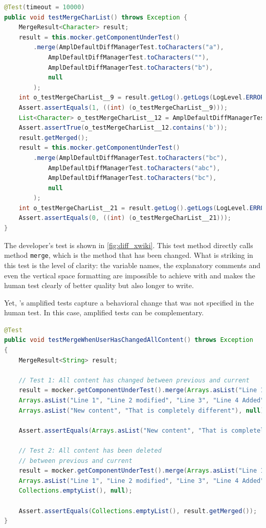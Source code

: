 \begin{lstlisting}[language=java,caption=Test generated by \DCIA that detects the behavioral change of \textsc{d3101ae} of XWiki.,label=fig:ampl_xwiki]
@Test(timeout = 10000)
public void testMergeCharList() throws Exception {
	MergeResult<Character> result;
	result = this.mocker.getComponentUnderTest()
		.merge(AmplDefaultDiffManagerTest.toCharacters("a"), 
			AmplDefaultDiffManagerTest.toCharacters(""), 
			AmplDefaultDiffManagerTest.toCharacters("b"), 
			null
		);
	int o_testMergeCharList__9 = result.getLog().getLogs(LogLevel.ERROR).size();
	Assert.assertEquals(1, ((int) (o_testMergeCharList__9)));
	List<Character> o_testMergeCharList__12 = AmplDefaultDiffManagerTest.toCharacters("b");
	Assert.assertTrue(o_testMergeCharList__12.contains('b'));
	result.getMerged();
	result = this.mocker.getComponentUnderTest()
		.merge(AmplDefaultDiffManagerTest.toCharacters("bc"), 
			AmplDefaultDiffManagerTest.toCharacters("abc"), 
			AmplDefaultDiffManagerTest.toCharacters("bc"), 
			null
		);
	int o_testMergeCharList__21 = result.getLog().getLogs(LogLevel.ERROR).size();
	Assert.assertEquals(0, ((int) (o_testMergeCharList__21)));
}
\end{lstlisting}

The developer's test is shown in \autoref{fig:diff_xwiki}.
This test method directly calls method \texttt{merge}, which is the method that has been changed. 
What is striking in this test is the level of clarity: 
the variable names, the explanatory comments and even the vertical space formatting are impossible to achieve with \DCIA and makes the human test clearly of better quality but also longer to write.

Yet, \DCIA's amplified tests capture a behavioral change that was not specified in the human test.
In this case, amplified tests can be complementary.

\begin{lstlisting}[language=java,caption=Developer test for \textsc{d3101ae} of XWiki.,label=fig:diff_xwiki]
@Test
public void testMergeWhenUserHasChangedAllContent() throws Exception
{
	MergeResult<String> result;

	// Test 1: All content has changed between previous and current
	result = mocker.getComponentUnderTest().merge(Arrays.asList("Line 1", "Line 2", "Line 3"),
	Arrays.asList("Line 1", "Line 2 modified", "Line 3", "Line 4 Added"),
	Arrays.asList("New content", "That is completely different"), null);

	Assert.assertEquals(Arrays.asList("New content", "That is completely different"), result.getMerged());

	// Test 2: All content has been deleted 
	// between previous and current
	result = mocker.getComponentUnderTest().merge(Arrays.asList("Line 1", "Line 2", "Line 3"),
	Arrays.asList("Line 1", "Line 2 modified", "Line 3", "Line 4 Added"),
	Collections.emptyList(), null);

	Assert.assertEquals(Collections.emptyList(), result.getMerged());
}
\end{lstlisting}


